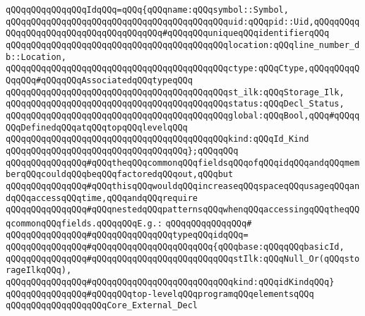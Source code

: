 \verb|qQQqqQQqqQQqqQQqIdqQQq=qQQq{qQQqname:qQQqsymbol::Symbol,|\newline
\verb|qQQqqQQqqQQqqQQqqQQqqQQqqQQqqQQqqQQqqQQqqQQquid:qQQqpid::Uid,qQQqqQQqqQQqqQQqqQQqqQQqqQQqqQQqqQQqqQQq#qQQqqQQquniqueqQQqidentifierqQQq|\newline
\verb|qQQqqQQqqQQqqQQqqQQqqQQqqQQqqQQqqQQqqQQqqQQqlocation:qQQqline_number_db::Location,|\newline
\verb|qQQqqQQqqQQqqQQqqQQqqQQqqQQqqQQqqQQqqQQqqQQqctype:qQQqCtype,qQQqqQQqqQQqqQQq#qQQqqQQqAssociatedqQQqtypeqQQq|\newline
\verb|qQQqqQQqqQQqqQQqqQQqqQQqqQQqqQQqqQQqqQQqqQQqst_ilk:qQQqStorage_Ilk,|\newline
\verb|qQQqqQQqqQQqqQQqqQQqqQQqqQQqqQQqqQQqqQQqqQQqstatus:qQQqDecl_Status,|\newline
\verb|qQQqqQQqqQQqqQQqqQQqqQQqqQQqqQQqqQQqqQQqqQQqglobal:qQQqBool,qQQq#qQQqqQQqDefinedqQQqatqQQqtopqQQqlevelqQQq|\newline
\verb|qQQqqQQqqQQqqQQqqQQqqQQqqQQqqQQqqQQqqQQqqQQqkind:qQQqId_Kind|\newline
\verb|qQQqqQQqqQQqqQQqqQQqqQQqqQQqqQQqqQQq};qQQqqQQq|\newline
\newline
\verb|qQQqqQQqqQQqqQQq#qQQqtheqQQqcommonqQQqfieldsqQQqofqQQqidqQQqandqQQqmemberqQQqcouldqQQqbeqQQqfactoredqQQqout,qQQqbut|\newline
\verb|qQQqqQQqqQQqqQQq#qQQqthisqQQqwouldqQQqincreaseqQQqspaceqQQqusageqQQqandqQQqaccessqQQqtime,qQQqandqQQqrequire|\newline
\verb|qQQqqQQqqQQqqQQq#qQQqnestedqQQqpatternsqQQqwhenqQQqaccessingqQQqtheqQQqcommonqQQqfields.qQQqqQQqE.g.:|\newline
\verb|qQQqqQQqqQQqqQQq#|\newline
\verb|qQQqqQQqqQQqqQQq#qQQqqQQqqQQqqQQqtypeqQQqidqQQq=|\newline
\verb|qQQqqQQqqQQqqQQq#qQQqqQQqqQQqqQQqqQQqqQQq{qQQqbase:qQQqqQQqbasicId,|\newline
\verb|qQQqqQQqqQQqqQQq#qQQqqQQqqQQqqQQqqQQqqQQqqQQqstIlk:qQQqNull_Or(qQQqstorageIlkqQQq),|\newline
\verb|qQQqqQQqqQQqqQQq#qQQqqQQqqQQqqQQqqQQqqQQqqQQqkind:qQQqidKindqQQq}|\newline
\newline
\newline
\newline
\verb|qQQqqQQqqQQqqQQq#qQQqqQQqtop-levelqQQqprogramqQQqelementsqQQq|\newline
\verb|qQQqqQQqqQQqqQQqqQQqCore_External_Decl|\newline
